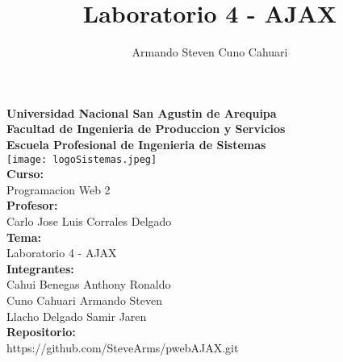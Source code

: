 \documentclass[10pt, a4paper]{article}
\title{Laboratorio 4 - AJAX}
\author{Armando Steven Cuno Cahuari}
\newcommand{\integrante}{\fontsize{13}{14}\selectfont Cahui Benegas Anthony Ronaldo \\ Cuno Cahuari Armando Steven \\  Llacho Delgado Samir Jaren}
\newcommand{\curso}{ \fontsize{13}{14}\selectfont Programacion Web 2}
\newcommand{\tema}{\fontsize{13}{14}\selectfont Laboratorio 4 - AJAX}
\newcommand{\repositorio}{\fontsize{13}{14}\selectfont https://github.com/SteveArms/pwebAJAX.git}
\newcommand{\profesor}{Carlo Jose Luis Corrales Delgado}
\begin{document}
\begin{titlepage}
	\centering
	\textbf{\fontsize{20}{19}\selectfont Universidad Nacional San Agustin de Arequipa} \\
	\vspace{1em}
	\textbf{\fontsize{15}{16}\selectfont Facultad de Ingenieria de Produccion y Servicios} \\ 
	\vspace{1em}
	\textbf{\fontsize{15}{16}\selectfont Escuela Profesional de Ingenieria de Sistemas} \\
	\vspace{1cm}
	\texttt{[image: logoSistemas.jpeg]} \\
	\vspace{1cm}
	\textbf{\fontsize{13}{14}\selectfont Curso: } \\ \vspace{1em}
	\curso \\ \vspace{1em}
	\textbf{\fontsize{13}{14}\selectfont Profesor:} \\ \vspace{1em}
	\profesor \\ \vspace{1em}
	\textbf{\fontsize{13}{14}\selectfont Tema: } \\ \vspace{1em}
	\tema \\ \vspace{1em}
	\textbf{\fontsize{13}{14}\selectfont Integrantes: } \\ \vspace{1em}
	\integrante \\ \vspace{1em}
	\textbf{\fontsize{13}{14}\selectfont Repositorio:} \\ \vspace{1em}
	\repositorio \\ \vspace{1em}
	\textbf{\fontsize{20}{14}} \\ \vspace{5em}
\end{titlepage}
\end{document}
